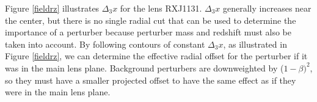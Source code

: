 Figure \ref{fieldrz} illustrates $\Delta_3 x$ for the lens RXJ1131. $\Delta_3 x$ generally increases near the center, but there is no single radial cut that can be used to determine the importance of a perturber because perturber mass and redshift must also be taken into account. By following contours of constant $\Delta_3 x$, as illustrated in Figure \ref{fieldrz}, we can determine the effective radial offset for the perturber if it was in the main lens plane. Background perturbers are downweighted by ($1-\beta)^2$, so they must have a smaller projected offset to have the same effect as if they were in the main lens plane.
  